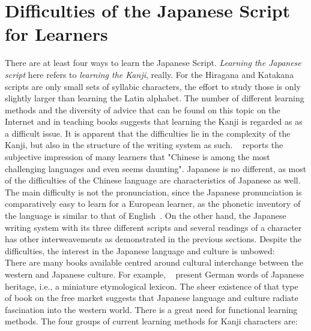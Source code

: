 \section{Difficulties of the Japanese Script for Learners}
\label{sec:japanesedifficulties}


There are at least four ways to learn the Japanese Script. 
\emph{Learning the Japanese script} here refers to \emph{learning the Kanji}, really. For the Hiragana and Katakana scripts are only small sets of syllabic 
characters, the effort to study those is only slightly larger than learning 
the Latin alphabet. The number of different learning methods and the diversity 
of advice that can be found on this topic on the Internet and in teaching books 
suggests that learning the Kanji is regarded as as a difficult issue.
It is apparent that the difficulties lie in the complexity of the Kanji, 
but also in the structure of the writing system as such. 
~\citeyear{Stahlmann2004} reports the subjective 
impression of many learners that "Chinese is among the most challenging languages
and even seems daunting". Japanese is no different, as most of the difficulties 
of the Chinese language are characteristics of Japanese as well. 
The main difficulty is not the pronunciation, since the Japanese pronunciation 
is comparatively easy to learn for a European learner, 
as the phonetic inventory of the language is similar to that of 
English~. On the other hand, the Japanese writing 
system with its three different scripts and several readings of a character 
has other interweavements as demonstrated in the previous sections.
Despite the difficulties, the interest in the Japanese language and 
culture is unbowed:\\
There are many books available centred around cultural interchange between
the western and Japanese culture. For example, 
~\citeyear{Haschke2008} present
German words of Japanese heritage, i.e., a miniature etymological lexicon.
The sheer existence of that type of book on the free market suggests that 
Japanese language and culture radiate fascination into the western world.
There is a great need for functional learning methods.
The four groups of current learning methods for Kanji characters are:
